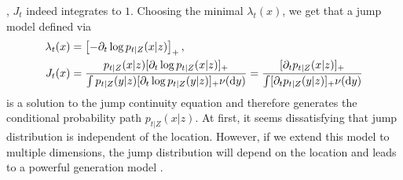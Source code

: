\documentclass{fairmeta}
\numberwithin{equation}{section}
\begin{document}
\ie, $J_t$ indeed integrates to $1$. Choosing the minimal $\lambda_t(x)$, we get that a jump model defined via
\begin{align*}
    \lambda_t(x) &= \left [-\partial_t \log p_{t|Z}(x|z)\right ]_{+}, \\
    J_t(x)&= \frac{p_{t|Z}(x|z)[\partial_t\log p_{t|Z}(x|z)]_{+}}{\int p_{t|Z}(y|z)[\partial_t \log p_{t|Z}(y|z)]_{+}\nu(\mathrm{d} y)}
    =\frac{[\partial_t  p_{t|Z}(x|z)]_{+}}{\int[\partial_t p_{t|Z}(y|z)]_{+}\nu(\mathrm{d} y)}
\end{align*}
is a solution to the jump continuity equation and therefore generates the conditional probability path $p_{t|Z}(x|z)$. At first, it seems dissatisfying that jump distribution is independent of the location. However, if we extend this model to multiple dimensions, the jump distribution will depend on the location and leads to a powerful generation model \citep{holderrieth2024gm}.
\end{document}
